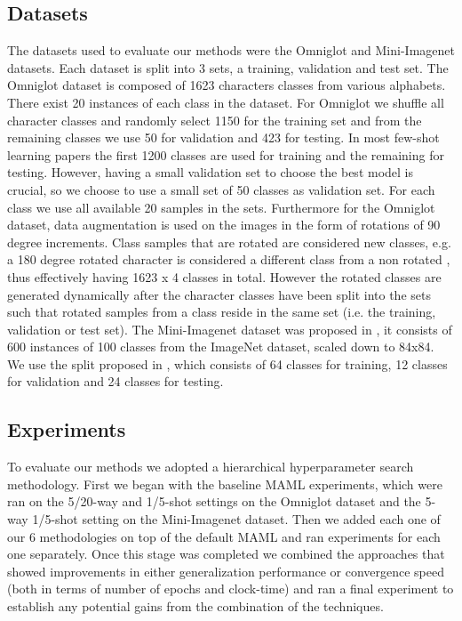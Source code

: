 \documentclass{article} \usepackage[dvipsnames]{xcolor}
\begin{document}
\subsection{Datasets}\label{datasets-maml}
The datasets used to evaluate our methods were the Omniglot \citep{lake2015human} and Mini-Imagenet \citep{vinyals2016matching,ravi2016optimization} datasets. Each dataset is split into 3 sets, a training, validation and test set. The Omniglot dataset is composed of 1623 characters classes from various alphabets. There exist 20 instances of each class in the dataset. For Omniglot we shuffle all character classes and randomly select 1150 for the training set and from the remaining classes we use 50 for validation and 423 for testing. In most few-shot learning papers the first 1200 classes are used for training and the remaining for testing. However, having a small validation set to choose the best model is crucial, so we choose to use a small set of 50 classes as validation set. For each class we use all available 20 samples in the sets. Furthermore for the Omniglot dataset, data augmentation is used on the images in the form of rotations of 90 degree increments. Class samples that are rotated are considered new classes, e.g. a 180 degree rotated character  is considered a different class from a non rotated , thus effectively having 1623 x 4 classes in total. However the rotated classes are generated dynamically after the character classes have been split into the sets such that rotated samples from a class reside in the same set (i.e. the training, validation or test set).
The Mini-Imagenet dataset was proposed in \cite{ravi2016optimization}, it consists of 600 instances of 100 classes from the ImageNet dataset, scaled down to 84x84. We use the split proposed in \cite{ravi2016optimization}, which consists of 64 classes for training, 12 classes for validation and 24 classes for testing.

\subsection{Experiments}
To evaluate our methods we adopted a hierarchical hyperparameter search methodology. First we began with the baseline MAML experiments, which were ran on the 5/20-way and 1/5-shot settings on the Omniglot dataset and the 5-way 1/5-shot setting on the Mini-Imagenet dataset. Then we added each one of our 6 methodologies on top of the default MAML and ran experiments for each one separately. Once this stage was completed we combined the approaches that showed improvements in either generalization performance or convergence speed (both in terms of number of epochs and clock-time) and ran a final experiment to establish any potential gains from the combination of the techniques.  
\end{document}
